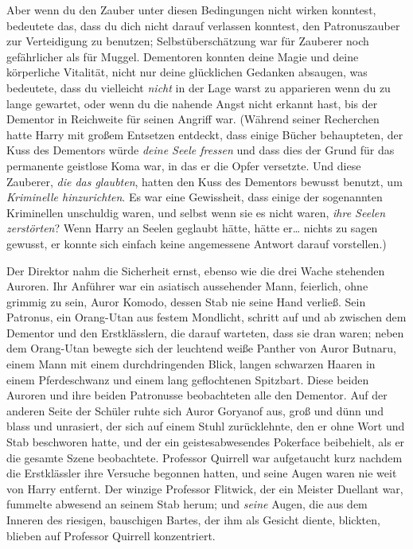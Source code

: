 {Aber wenn du den Zauber unter diesen Bedingungen nicht wirken konntest, bedeutete das, dass du dich nicht darauf verlassen konntest, den Patronuszauber zur Verteidigung zu benutzen; Selbstüberschätzung war für Zauberer noch gefährlicher als für Muggel. Dementoren konnten deine Magie und deine körperliche Vitalität, nicht nur deine glücklichen Gedanken absaugen, was bedeutete, dass du vielleicht \emph{nicht} in der Lage warst zu apparieren wenn du zu lange gewartet, oder wenn du die nahende Angst nicht erkannt hast, bis der Dementor in Reichweite für seinen Angriff war. (Während seiner Recherchen hatte Harry mit großem Entsetzen entdeckt, dass einige Bücher behaupteten, der Kuss des Dementors würde \emph{deine Seele fressen} und dass dies der Grund für das permanente geistlose Koma war, in das er die Opfer versetzte. Und diese Zauberer, \emph{die das glaubten}, hatten den Kuss des Dementors bewusst benutzt, um \emph{Kriminelle hinzurichten}. Es war eine Gewissheit, dass einige der sogenannten Kriminellen unschuldig waren, und selbst wenn sie es nicht waren, \emph{ihre Seelen zerstörten}? Wenn Harry an Seelen geglaubt hätte, hätte er… nichts zu sagen gewusst, er konnte sich einfach keine angemessene Antwort darauf vorstellen.)

Der Direktor nahm die Sicherheit ernst, ebenso wie die drei Wache stehenden Auroren. Ihr Anführer war ein asiatisch aussehender Mann, feierlich, ohne grimmig zu sein, Auror Komodo, dessen Stab nie seine Hand verließ. Sein Patronus, ein Orang-Utan aus festem Mondlicht, schritt auf und ab zwischen dem Dementor und den Erstklässlern, die darauf warteten, dass sie dran waren; neben dem Orang-Utan bewegte sich der leuchtend weiße Panther von Auror Butnaru, einem Mann mit einem durchdringenden Blick, langen schwarzen Haaren in einem Pferdeschwanz und einem lang geflochtenen Spitzbart. Diese beiden Auroren und ihre beiden Patronusse beobachteten alle den Dementor. Auf der anderen Seite der Schüler ruhte sich Auror Goryanof aus, groß und dünn und blass und unrasiert, der sich auf einem Stuhl zurücklehnte, den er ohne Wort und Stab beschworen hatte, und der ein geistesabwesendes Pokerface beibehielt, als er die gesamte Szene beobachtete. Professor Quirrell war aufgetaucht kurz nachdem die Erstklässler ihre Versuche begonnen hatten, und seine Augen waren nie weit von Harry entfernt. Der winzige Professor Flitwick, der ein Meister Duellant war, fummelte abwesend an seinem Stab herum; und \emph{seine} Augen, die aus dem Inneren des riesigen, bauschigen Bartes, der ihm als Gesicht diente, blickten, blieben auf Professor Quirrell konzentriert.

}
